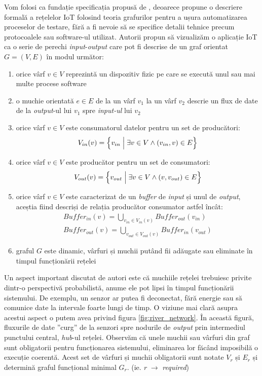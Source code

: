 Vom folosi ca fundație specificația propusă de \citet{Paduraru2021}, deoarece propune o descriere formală a rețelelor IoT folosind teoria grafurilor pentru a ușura automatizarea proceselor de testare, fără a fi nevoie să se specifice detalii tehnice precum protocoalele sau software-ul utilizat. Autorii propun să vizualizăm o aplicație IoT ca o serie de perechi \textit{input}-\textit{output} care pot fi descrise de un graf orientat $G = (V, E)$ în modul următor:

\begin{enumerate}
    \item orice vârf $v \in V$ reprezintă un dispozitiv fizic pe care se execută unul sau mai multe procese software
    \item o muchie orientată $e \in E$ de la un vârf $v_1$ la un vârf $v_2$ descrie un flux de date de la \textit{output}-ul lui $v_1$ spre \textit{input-ul} lui $v_2$
    \item orice vârf $v \in V$ este consumatorul datelor pentru un set de producători: 
        \begin{gather*}
            V_{in}(v) = \Big{\{} v_{in} \; \Big{|} \; \exists v \in V \land (v_{in}, v) \in E \Big{\}}
        \end{gather*}
    \item orice vârf $v \in V$ este producător pentru un set de consumatori:
        \begin{gather*}
            V_{out}(v) = \Big{\{} v_{out} \; \Big{|} \; \exists v \in V \land (v, v_{out}) \in E \Big{\}}
        \end{gather*}
    \item orice vârf $v \in V$ este caracterizat de un \textit{buffer} de \textit{input} și unul de \textit{output}, aceștia fiind descriși de relația producător consumator astfel încât: 
        \begin{gather*}
            Buffer_{in}(v) = \bigcup_{v_{in} \in V_{in}(v)} Buffer_{out}(v_{in}) \\
            Buffer_{out}(v) = \bigcup_{v_{out} \in V_{out}(v)} Buffer_{in}(v_{out})
        \end{gather*}
    \item graful $G$ este dinamic, vârfuri și muchii putând fii adăugate sau eliminate în timpul funcționării rețelei
\end{enumerate}

Un aspect important discutat de autori este că muchiile rețelei trebuiesc privite dintr-o perspectivă probabilistă, anume ele pot lipsi în timpul funcționării sistemului. De exemplu, un senzor ar putea fi deconectat, fără energie sau să comunice date la intervale foarte lungi de timp. O viziune mai clară asupra acestui aspect o putem avea privind figura \ref{fig:river_network}. În această figură, fluxurile de date ”curg” de la senzori spre nodurile de \textit{output} prin intermediul punctului central, \textit{hub}-ul rețelei. Observăm că unele muchii sau vârfuri din graf sunt obligatorii pentru funcționarea sistemului, eliminarea lor făcând imposibilă o execuție coerentă. Acest set de vârfuri și muchii obligatorii sunt notate $V_r$ și $E_r$ și determină graful funcțional minimal $G_r$. (ie. \textit{r} $\rightarrow$ \textit{required})

